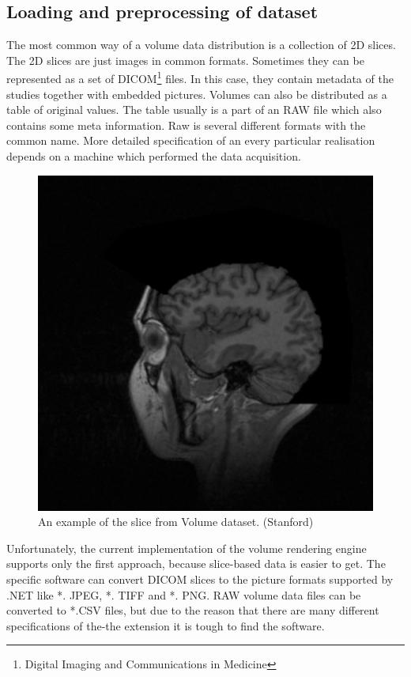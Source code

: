 \documentclass[twoside, english, 11pt]{report}
\begin{document}
\subsection{Loading and preprocessing of dataset}
The most common way of a volume data distribution is a collection of 2D slices. The 2D slices are just images in common formats. Sometimes they can be represented as a set of DICOM\footnote{Digital Imaging and Communications in Medicine} files. In this case, they contain metadata of the studies together with embedded pictures. Volumes can also be distributed as a table of original values. The table usually is a part of an RAW file which also contains some meta information. Raw is several different formats with the common name. More detailed specification of an every particular realisation depends on a machine which performed the data acquisition.\\
\begin{figure}[!h]
\centerline{\includegraphics[scale = 0.35]{img/slice}}
\caption{An example of the slice from Volume dataset. (Stanford)\label{fig:slice}}
\end{figure}
Unfortunately, the current implementation of the volume rendering engine supports only the first approach, because slice-based data is easier to get. The specific software can convert DICOM slices to the picture formats supported by .NET like *. JPEG, *. TIFF and *. PNG. RAW volume data files can be converted to *.CSV files, but due to the reason that there are many different specifications of the-the extension it is tough to find the software.\\
\end{document}
